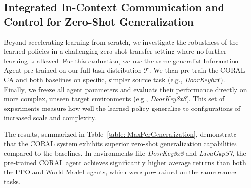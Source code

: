 \documentclass[letterpaper]{article} %
\begin{document}
\subsection{Integrated In-Context Communication and Control for Zero-Shot Generalization}
Beyond accelerating learning from scratch, we investigate the robustness of the learned policies in a challenging zero-shot transfer setting where no further learning is allowed. For this evaluation, we use the same generalist Information Agent pre-trained on our full task distribution $\mathcal{T}$. We then pre-train the CORAL CA and both baselines on specific, simpler source task (e.g., \textit{DoorKey6x6}). Finally, we freeze all agent parameters and evaluate their performance directly on more complex, unseen target environments (e.g., \textit{DoorKey8x8}). This set of experiments measure how well the learned policy generalize to configurations of increased scale and complexity.

The results, summarized in Table~\ref{table: MaxPerGeneralization}, demonstrate that the CORAL system exhibits superior zero-shot generalization capabilities compared to the baselines. In environments like \textit{DoorKey8x8} and \textit{LavaGapS7}, the pre-trained CORAL agent achieves significantly higher average returns than both the PPO and World Model agents, which were pre-trained on the same source tasks. 
\end{document}
